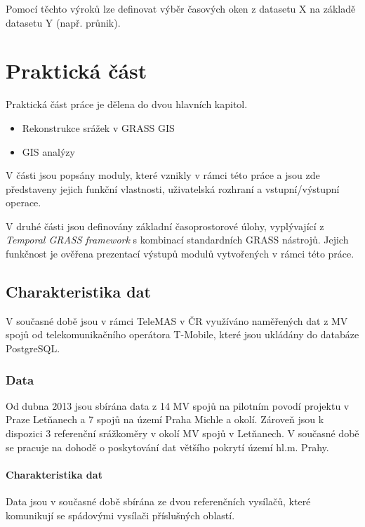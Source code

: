 \documentclass[a4paper,12pt,oneside]{report}
\begin{document}
Pomocí těchto výroků lze definovat výběr časových oken z datasetu X
na základě datasetu Y (např. průnik).


\newpage
\setcounter{footnote}{1}
\chapter*{Praktická část}


Praktická část práce je dělena do dvou hlavních kapitol.

\begin{itemize}
\item Rekonstrukce srážek v GRASS GIS
\item GIS analýzy
\end{itemize}


V části jsou popsány moduly, které vznikly v rámci této práce a jsou zde předst\-aveny jejich funkční vlastnosti, uživatelská rozhraní a  vstupní/výstupní operace.

V druhé části  jsou definovány základní časoprostorové úlohy,
vyplývající z \textit{Temporal GRASS framework} s kombinací
standardních GRASS nástrojů. Jejich funkčnost je ověřena  prezentací výstupů modulů vytvořených v rámci této práce. 

\setcounter{footnote}{1}
\section{Charakteristika dat}
V současné době jsou v rámci  TeleMAS v ČR využíváno naměřených dat z MV spojů od telekomunikačního
operátora T-Mobile, které jsou ukládány do databáze PostgreSQL.

\subsection*{Data}  
 
Od dubna 2013 jsou sbírána data z 14 MV spojů na pilotním povodí
projektu v Praze Letňanech a 7 spojů na území Praha Michle a
okolí. Zároveň jsou k dispozici 3 referenční srážkoměry v okolí MV
spojů v Letňanech.  V současné době se pracuje na dohodě o poskytování
dat většího pokrytí území hl.m. Prahy.

\subsubsection*{Charakteristika dat} Data jsou v současné době
sbírána ze dvou referenčních vysílačů, které komunikují se spádovými
vysílači příslušných oblastí.
\end{document}
